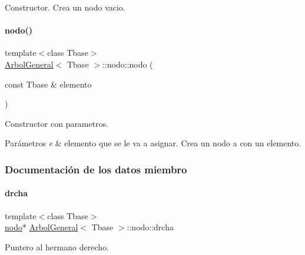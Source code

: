 Constructor. Crea un nodo vacio. 

\hypertarget{structArbolGeneral_1_1nodo_a858436a6f4cf67e88dcea51708871de9}{}\label{structArbolGeneral_1_1nodo_a858436a6f4cf67e88dcea51708871de9} 
\paragraph{\texorpdfstring{nodo()}{nodo()}\hspace{0.1cm}{\footnotesize\ttfamily [2/2]}}
{\footnotesize\ttfamily template$<$class Tbase$>$ \\
\hyperlink{classArbolGeneral}{Arbol\+General}$<$ Tbase $>$\+::nodo\+::nodo (\begin{DoxyParamCaption}\item[{const Tbase \&}]{elemento }\end{DoxyParamCaption})\hspace{0.3cm}{\ttfamily [inline]}}



Constructor con parametros. 


\begin{DoxyParams}{Parámetros}
{\em e} & elemento que se le va a asignar. Crea un nodo a con un elemento. \\
\hline
\end{DoxyParams}


\subsubsection{Documentación de los datos miembro}
\hypertarget{structArbolGeneral_1_1nodo_a8d0a58447171461212942f9308ef4f36}{}\label{structArbolGeneral_1_1nodo_a8d0a58447171461212942f9308ef4f36} 
\paragraph{\texorpdfstring{drcha}{drcha}}
{\footnotesize\ttfamily template$<$class Tbase$>$ \\
\hyperlink{structArbolGeneral_1_1nodo}{nodo}$\ast$ \hyperlink{classArbolGeneral}{Arbol\+General}$<$ Tbase $>$\+::nodo\+::drcha}



Puntero al hermano derecho. 

